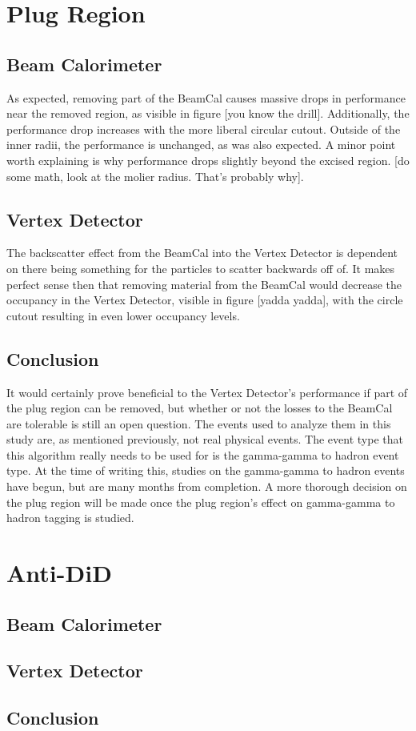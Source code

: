 \documentclass{report}
\begin{document}
        \section{Plug Region}
            \subsection{Beam Calorimeter}
                As expected, removing part of the BeamCal causes massive drops in performance near the removed region, as visible in figure [you know the drill]. Additionally, the performance drop increases with the more liberal circular cutout. Outside of the inner radii, the performance is unchanged, as was also expected. A minor point worth explaining is why performance drops slightly beyond the excised region. [do some math, look at the molier radius. That's probably why].
                
            \subsection{Vertex Detector} 
                The backscatter effect from the BeamCal into the Vertex Detector is dependent on there being something for the particles to scatter backwards off of. It makes perfect sense then that removing material from the BeamCal would decrease the occupancy in the Vertex Detector, visible in figure [yadda yadda], with the circle cutout resulting in even lower occupancy levels.
                

            \subsection{Conclusion} 
                 It would certainly prove beneficial to the Vertex Detector's performance if part of the plug region can be removed, but whether or not the losses to the BeamCal are tolerable is still an open question. The events used to analyze them in this study are, as mentioned previously, not real physical events. The event type that this algorithm really needs to be used for is the gamma-gamma to hadron event type. At the time of writing this, studies on the gamma-gamma to hadron events have begun, but are many months from completion. A more thorough decision on the plug region will be made once the plug region's effect on gamma-gamma to hadron tagging is studied.

        
        \section{Anti-DiD}
            \subsection{Beam Calorimeter}

            \subsection{Vertex Detector} 

            \subsection{Conclusion}







        
    
\end{document}
